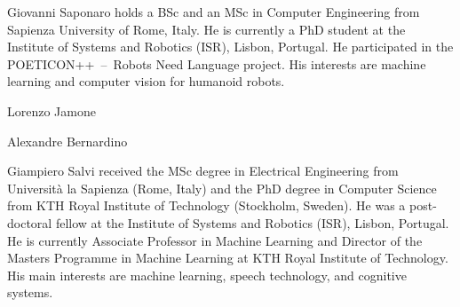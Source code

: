 \begin{IEEEbiography}{Giovanni Saponaro}
holds a BSc and an MSc in Computer Engineering from Sapienza University of Rome, Italy. He is currently a PhD student at the Institute of Systems and Robotics (ISR), Lisbon, Portugal. He participated in the POETICON++~--~Robots Need Language project. His interests are machine learning and computer vision for humanoid robots.
\end{IEEEbiography}

\begin{IEEEbiography}{Lorenzo Jamone}
\end{IEEEbiography}

\begin{IEEEbiography}{Alexandre Bernardino}
\end{IEEEbiography}

\begin{IEEEbiography}{Giampiero Salvi}
received the MSc degree in Electrical Engineering from Università la Sapienza (Rome, Italy) and the PhD degree in Computer Science from KTH Royal Institute of Technology (Stockholm, Sweden). He was a post-doctoral fellow at the Institute of Systems and Robotics (ISR), Lisbon, Portugal. He is currently Associate Professor in Machine Learning and Director of the Masters Programme in Machine Learning at KTH Royal Institute of Technology. His main interests are machine learning, speech technology, and cognitive systems.
\end{IEEEbiography}
